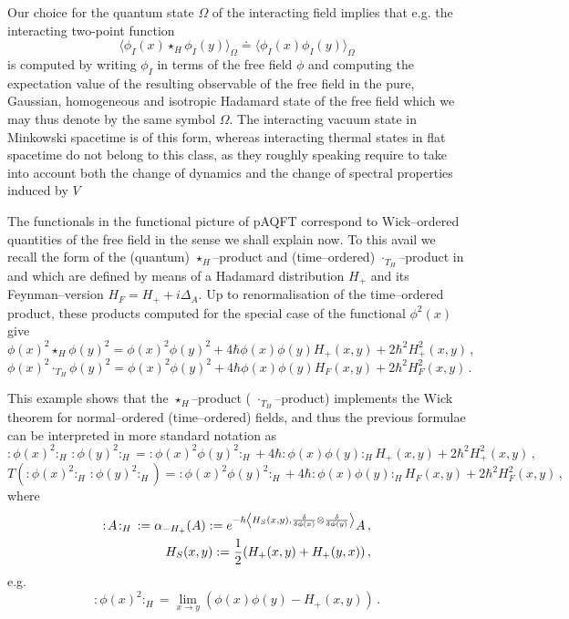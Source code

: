 \documentclass[10pt]{book}
\newcommand{\wick}[1]{:\!{#1}\!:}
\theoremstyle{break}
\begin{document}
Our choice for the quantum state $\Omega$ of the interacting field implies that e.g. the interacting two-point function 
$$\langle \phi_I(x)\star_H\phi_I(y)\rangle_\Omega\doteq \langle \phi_I(x)\phi_I(y)\rangle_\Omega$$
is computed by writing $\phi_I$ in terms of the free field $\phi$ and computing the expectation value of the resulting observable of the free field in the pure, Gaussian, homogeneous and isotropic Hadamard state of the free field which we may thus denote by the same symbol $\Omega$. The interacting vacuum state in Minkowski spacetime is of this form, whereas interacting thermal states in flat spacetime do not belong to this class, as they roughly speaking require to take into account both the change of dynamics and the change of spectral properties induced by $V$ %

The functionals in the functional picture of pAQFT correspond to Wick--ordered quantities of the free field in the sense we shall explain now. To this avail we recall the form of the (quantum) $\star_H$--product and (time--ordered) $\cdot_{T_H}$--product in %
and %
which are defined by means of a Hadamard distribution $H_+$ and its Feynman--version $H_F = H_+ + i \Delta_A$. Up to renormalisation of the time--ordered product, these products computed for the special case of the functional $\phi^2(x)$ give
$$
\phi(x)^2\star_H \phi(y)^2=\phi(x)^2\phi(y)^2+4\hbar \phi(x)\phi(y) H_+(x,y)+2\hbar^2 H^2_+(x,y)\,,
$$
$$
\phi(x)^2\cdot_{T_H}\phi(y)^2=\phi(x)^2\phi(y)^2+4\hbar \phi(x)\phi(y) H_F(x,y)+2\hbar^2 H^2_F(x,y)\,.
$$

This example shows that the $\star_H$--product ( $\cdot_{T_H}$--product) implements the Wick theorem for normal--ordered (time--ordered) fields, and thus the previous formulae can be interpreted in more standard notation as 
$$\wick{\phi(x)^2}_H\,\wick{\phi(y)^2}_H=\wick{\phi(x)^2\phi(y)^2}_H+4\hbar \wick{\phi(x)\phi(y)}_H H_+(x,y)+2\hbar^2 H^2_+(x,y)\,,$$
$$T\left(\wick{\phi(x)^2}_H\,\wick{\phi(y)^2}_H\right)=\wick{\phi(x)^2\phi(y)^2}_H+4\hbar \wick{\phi(x)\phi(y)}_H H_F(x,y)+2\hbar^2 H^2_F(x,y)\,,$$
where
\begin{eqnarray}
{\wick{A}}_H\,:=\alpha_{-H_+}(A):=e^{-\hbar\left\langle H_S(x,y),\frac{\delta}{\delta\phi(x)}\otimes \frac{\delta}{\delta\phi(y)}\right\rangle}A\,,\\
H_S(x,y) := \frac12 (H_+(x,y)+H_+(y,x))\,,\notag
\end{eqnarray}
e.g. $$\wick{\phi(x)^2}_H=\lim_{x\to y}\left(\phi(x)\phi(y)-H_+(x,y)\right)\,.$$
\end{document}
